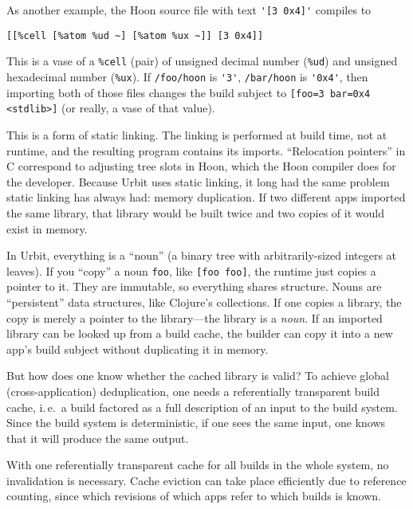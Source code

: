 \documentclass[twoside]{article}
\begin{document}
As another example, the Hoon source file with text \lstinline[style=inlinecode]{'[3 0x4]'} compiles to
\begin{lstlisting}[style=listingblock]
[[%cell [%atom %ud ~] [%atom %ux ~]] [3 0x4]]
\end{lstlisting}
\noindent
This is a vase of a \lstinline[style=inlinecode]{%cell} (pair) of unsigned decimal number (\lstinline[style=inlinecode]{%ud}) and unsigned hexadecimal number (\lstinline[style=inlinecode]{%ux}).  If \lstinline[style=inlinecode]{/foo/hoon} is \lstinline[style=inlinecode]{'3'}, \lstinline[style=inlinecode]{/bar/hoon} is \lstinline[style=inlinecode]{'0x4'}, then importing both of those files changes the build subject to \lstinline[style=inlinecode]{[foo=3 bar=0x4 <stdlib>]} (or really, a vase of that value).

This is a form of static linking.  The linking is performed at build time, not at runtime, and the resulting program contains its imports.  “Relocation pointers” in C correspond to adjusting tree slots in Hoon, which the Hoon compiler does for the developer.  Because Urbit uses static linking, it long had the same problem static linking has always had:  memory duplication.  If two different apps imported the same library, that library would be built twice and two copies of it would exist in memory.

In Urbit, everything is a “noun” (a binary tree with arbi\-trarily-sized integers at leaves).  If you “copy” a noun \lstinline[style=inlinecode]{foo}, like \lstinline[style=inlinecode]{[foo foo]}, the runtime just copies a pointer to it.  They are immutable, so everything shares structure.  Nouns are “persistent” data structures, like Clojure's collections.  If one copies a library, the copy is merely a pointer to the library—the library is a \emph{noun}.  If an imported library can be looked up from a build cache, the builder can copy it into a new app's build subject without duplicating it in memory.  

But how does one know whether the cached library is valid?  To achieve global (cross-application) deduplication, one needs a referentially transparent build cache, i.\,e.\ a build factored as a full description of an input to the build system.  Since the build system is deterministic, if one sees the same input, one knows that it will produce the same output.

With one referentially transparent cache for all builds in the whole system, no invalidation is necessary.  Cache eviction can take place efficiently due to reference counting, since which revisions of which apps refer to which builds is known.
\end{document}
